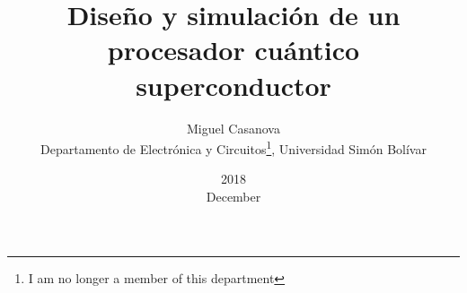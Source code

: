\title{Diseño y simulación de un procesador cuántico superconductor}
\date{2018\\ December}
\author{Miguel Casanova\\ Departamento de Electrónica y Circuitos\thanks{I am no longer a member of this department}, Universidad Simón Bolívar}
